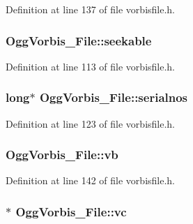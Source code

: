 Definition at line 137 of file vorbisfile.\+h.

\subsubsection[{\texorpdfstring{seekable}{seekable}}]{ Ogg\+Vorbis\+\_\+\+File\+::seekable}\hypertarget{struct_ogg_vorbis___file_a2a390c4f15c0d1fe0cf9c90fd0bae087}{}\label{struct_ogg_vorbis___file_a2a390c4f15c0d1fe0cf9c90fd0bae087}


Definition at line 113 of file vorbisfile.\+h.

\subsubsection[{\texorpdfstring{serialnos}{serialnos}}]{\setlength{\rightskip}{0pt plus 5cm}long$\ast$ Ogg\+Vorbis\+\_\+\+File\+::serialnos}\hypertarget{struct_ogg_vorbis___file_abd5a9adc78abd620ce2c63bd153df150}{}\label{struct_ogg_vorbis___file_abd5a9adc78abd620ce2c63bd153df150}


Definition at line 123 of file vorbisfile.\+h.

\subsubsection[{\texorpdfstring{vb}{vb}}]{ Ogg\+Vorbis\+\_\+\+File\+::vb}\hypertarget{struct_ogg_vorbis___file_a3201599977a781b7bf559167cd892638}{}\label{struct_ogg_vorbis___file_a3201599977a781b7bf559167cd892638}


Definition at line 142 of file vorbisfile.\+h.

\subsubsection[{\texorpdfstring{vc}{vc}}]{$\ast$ Ogg\+Vorbis\+\_\+\+File\+::vc}\hypertarget{struct_ogg_vorbis___file_a4467850c72aed93fe0a70e8f1fd6f20e}{}\label{struct_ogg_vorbis___file_a4467850c72aed93fe0a70e8f1fd6f20e}


